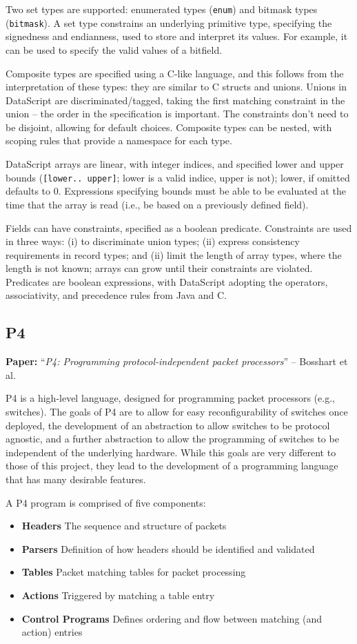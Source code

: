 \documentclass[10pt]{article}
\newcommand{\paper}[3]{\vspace{4mm}\noindent\textbf{Paper:} ``\textit{#1}'' -- #2 \cite{#3}\vspace{3mm}}
\begin{document}
Two set types are supported: enumerated types (\texttt{enum}) and bitmask types
(\texttt{bitmask}). A set type constrains an underlying primitive type, specifying the
signedness and endianness, used to store and interpret its values. For example, it can be
used to specify the valid values of a bitfield.

Composite types are specified using a C-like language, and this follows from the
interpretation of these types: they are similar to C structs and unions. Unions in
DataScript are discriminated/tagged, taking the first matching constraint in the union --
the order in the specification is important. The constraints don't need to be disjoint,
allowing for default choices. Composite types can be nested, with scoping rules that
provide a namespace for each type.

DataScript arrays are linear, with integer indices, and specified lower and upper
bounds (\texttt{[lower.. upper]}; lower is a valid indice, upper is not); lower, if
omitted defaults to 0. Expressions specifying bounds must be able to be evaluated at the
time that the array is read (i.e., be based on a previously defined field). 

Fields can have constraints, specified as a boolean predicate. Constraints are used in
three ways: (i) to discriminate union types; (ii) express consistency requirements in
record types; and (ii) limit the length of array types, where the length is not known;
arrays can grow until their constraints are violated. Predicates are boolean expressions,
with DataScript adopting the operators, associativity, and precedence rules from Java and
C. 

\subsection{P4}
\paper{P4: Programming protocol-independent packet processors}{Bosshart et al.}{bosshart2014p4}

P4 is a high-level language, designed for programming packet processors (e.g., switches).
The goals of P4 are to allow for easy reconfigurability of switches once deployed,
the development of an abstraction to allow switches to be protocol agnostic, and a further
abstraction to allow the programming of switches to be independent of the underlying
hardware. While this goals are very different to those of this project, they lead to the
development of a programming language that has many desirable features.

A P4 program is comprised of five components:
\begin{itemize}
\item \textbf{Headers} The sequence and structure of packets
\item \textbf{Parsers} Definition of how headers should be identified and validated
\item \textbf{Tables} Packet matching tables for packet processing
\item \textbf{Actions} Triggered by matching a table entry
\item \textbf{Control Programs} Defines ordering and flow between matching (and action) entries
\end{itemize}
\end{document}
